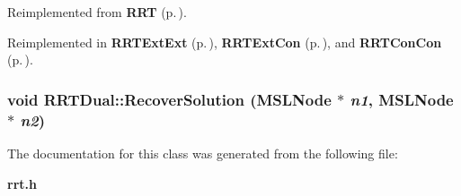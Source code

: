 Reimplemented from {\bf RRT} {\rm (p.\,\pageref{class_RRT_a3})}.

Reimplemented in {\bf RRTExt\-Ext} {\rm (p.\,\pageref{class_RRTExtExt_a2})}, {\bf RRTExt\-Con} {\rm (p.\,\pageref{class_RRTExtCon_a2})}, and {\bf RRTCon\-Con} {\rm (p.\,\pageref{class_RRTConCon_a2})}.
\subsubsection{\setlength{\rightskip}{0pt plus 5cm}void RRTDual::Recover\-Solution ({\bf MSLNode} $\ast$ {\em n1}, {\bf MSLNode} $\ast$ {\em n2})\hspace{0.3cm}{\tt  [protected]}}\label{class_RRTDual_b0}




The documentation for this class was generated from the following file:\begin{CompactItemize}
\item 
{\bf rrt.h}\end{CompactItemize}

